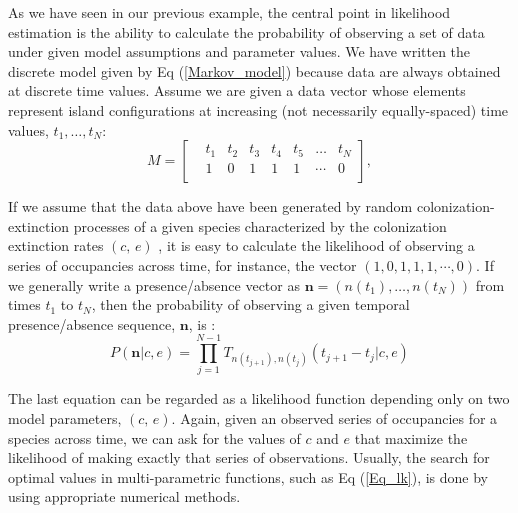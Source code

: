 \documentclass{article}
\begin{document}
As we have seen in our previous example, the central point in likelihood estimation is the ability to calculate the probability of observing a set of data under given model assumptions and parameter values. We have written the discrete model given by Eq (\ref{Markov_model}) because data are always obtained at discrete time values. Assume we are given a data vector whose elements represent island configurations at increasing (not necessarily equally-spaced) time values, $t_1, \dots, t_N$:
\begin{equation}
	\label{eq:data}
	M = 
	\left[
	\begin{array}{rccccccc}
	& t_1 & t_2 & t_3 & t_4  & t_5 & \dots & t_N                             \\
	& 1 & 0 & 1 & 1 & 1 & \cdots & 0                                   \\
	\end{array}
	\right],
\end{equation}
\smallskip

If we assume that the data above have been generated by random colonization-extinction processes of a given species characterized by the colonization extinction rates $(c,\, e)$ , it is easy to calculate the likelihood of observing a series of occupancies across time, for instance, the vector $(1, 0, 1, 1, 1, \cdots, 0)$. If we generally write a presence/absence vector as ${\boldsymbol n}=(n(t_1),\dots,n(t_N))$ from times $t_{1}$ to $t_N$, then the probability of observing a given temporal presence/absence sequence, ${\boldsymbol n}$, is \citep{Alonso2015}:
\begin{equation}
P( {\boldsymbol n} | c, e) = \prod_{j=1}^{N-1}T_{n(t_{j+1}),n(t_j)}(t_{j+1}-t_{j}| c,e) 
\label{Eq_lk}
\end{equation}

The last equation can be regarded as a likelihood function depending only on two model parameters, $(c,\,e)$. Again, given an observed series of occupancies for a species across time, we can ask for the values of $c$ and $e$ that maximize the likelihood of making exactly that series of observations. Usually, the search for optimal values in multi-parametric functions, such as Eq (\ref{Eq_lk}), is done by using appropriate numerical methods.
\smallskip
\end{document}
